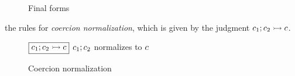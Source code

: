 \documentclass[index.tex]{subfiles}
\begin{document}
\begin{figure}[htb!]
\begin{mathpar}


  \end{mathpar}
  \caption{Final forms} 
  \label{fig:coercion-final-forms}
\end{figure}

 the rules for \emph{coercion normalization}, which is given by the
judgment $\normalizes{\CMV_1}{\CMV_2}{\CMV}$.

\begin{figure}[htb!]
  $\judgbox{\normalizes{\CMV_1}{\CMV_2}{\CMV}}$ $\CCompose{\CMV_1}{\CMV_2}$ normalizes to $\CMV$
  \newcommand{\normalizesRow}[3]{\ensuremath{\CCompose{#1}{#2} &\rightarrowtail& #3}}
  \begin{mathpar}







  \end{mathpar}
  \caption{Coercion normalization} 
  \label{fig:coercion-normalization}
\end{figure}
\end{document}
